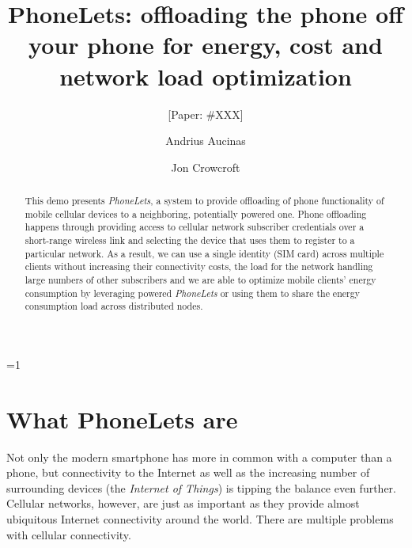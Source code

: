 \documentclass{sig-alternate-10pt}
\def\anon{0}        %
\begin{document}
\date{}


\title{PhoneLets: offloading the phone off your phone for energy, cost and network load optimization}
\ifnum\anon=1
\author{[Paper: \#XXX]}%
\else
{}
\author{
\alignauthor Andrius Aucinas\\
\and
\alignauthor Jon Crowcroft\\
}
\fi

    
\maketitle
\begin{abstract}
This demo presents \emph{PhoneLets}, a system to provide offloading of phone functionality of mobile cellular devices to a neighboring, potentially powered one. Phone offloading happens through providing access to cellular network subscriber credentials over a short-range wireless link and selecting the device that uses them to register to a particular network. As a result, we can use a single identity (SIM card) across multiple clients without increasing their connectivity costs, the load for the network handling large numbers of other subscribers and we are able to optimize mobile clients' energy consumption by leveraging powered \emph{PhoneLets} or using them to share the energy consumption load across distributed nodes.
\end{abstract} 

\section{What PhoneLets are}
\label{section:intro}

Not only the modern smartphone has more in common with a computer than a phone, but connectivity to the Internet as well as the increasing number of surrounding devices (the \emph{Internet of Things}) is tipping the balance even further. Cellular networks, however, are just as important as they provide almost ubiquitous Internet connectivity around the world. There are multiple problems with cellular connectivity.
\end{document}
